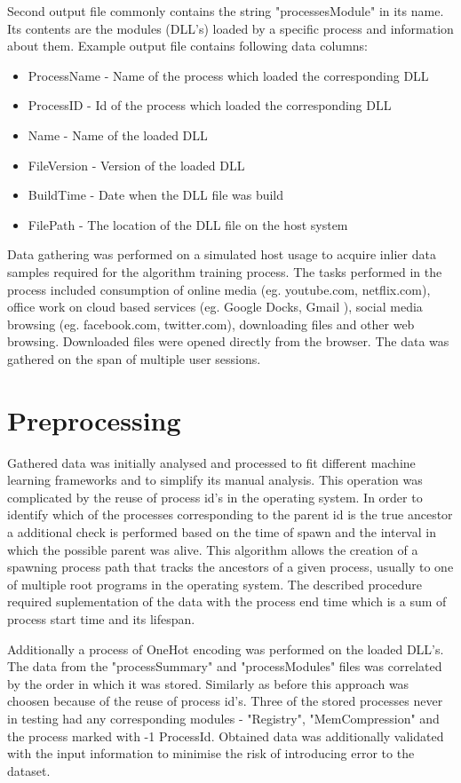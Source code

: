 \documentclass[a4paper,twoside,12pt]{book}
\begin{document}
Second output file commonly contains the string "processesModule" in its name. Its contents
are the modules (DLL's) loaded by a specific process and information about them. Example 
output file contains following data columns:
\begin{itemize}
	\item ProcessName - Name of the process which loaded the corresponding DLL
	\item ProcessID - Id of the process which loaded the corresponding DLL
	\item Name - Name of the loaded DLL
	\item FileVersion - Version of the loaded DLL
	\item BuildTime - Date when the DLL file was build
	\item FilePath - The location of the DLL file on the host system
\end{itemize}

Data gathering was performed on a simulated host usage to acquire inlier data samples required 
for the algorithm training process. The tasks performed in the process 
included consumption of online media (eg. youtube.com, netflix.com), office work on cloud 
based services (eg. Google Docks, Gmail ), social media browsing (eg. facebook.com, 
twitter.com), downloading files and other web browsing. Downloaded files were opened 
directly from the browser. The data was gathered on the span of multiple user sessions.

\section{Preprocessing}

Gathered data was initially analysed and processed to fit different machine learning 
frameworks and to simplify its manual analysis. This operation was complicated by the 
reuse of process id's in the operating system. In order to identify which of the processes 
corresponding to the parent id is the true ancestor a additional check is performed based 
on the time of spawn and the interval in which the possible parent was alive. This algorithm 
allows the creation of a spawning process path that tracks the ancestors of a given process, 
usually to one of multiple root programs in the operating system. The described procedure
required suplementation of the data with the process end time which is a sum of process
start time and its lifespan. 

Additionally a process of OneHot encoding was performed on the loaded DLL's. The data from 
the "processSummary" and "processModules" files was correlated by the order in which it was 
stored. Similarly as before this approach was choosen because of the reuse of process id's.
Three of the stored processes never in testing had any corresponding modules - 
"Registry", "MemCompression" and the process marked with -1 ProcessId. Obtained data was
additionally validated with the input information to minimise the risk of introducing error
to the dataset.
\end{document}
